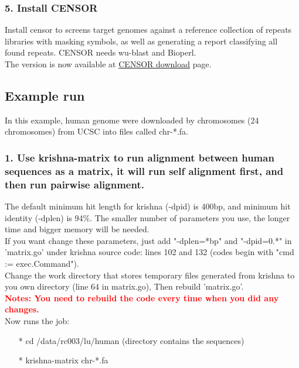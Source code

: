 \documentclass[12pt]{report}
\begin{document}
\subsubsection{5. Install CENSOR}
Install censor to screens target genomes against a reference collection of repeats libraries with masking symbols, as well as generating a report classifying all found repeats. CENSOR needs wu-blast and Bioperl.\\

The version is now available at \href{http://www.girinst.org/downloads/software/censor/} {\color{blue}CENSOR download} page.

\subsection*{Example run}
In this example, human genome were downloaded by chromosomes (24 chromosomes) from UCSC into files called chr-*.fa.\\

\subsubsection{1. Use krishna-matrix to run alignment between human sequences as a matrix, it will run self alignment first, and then run pairwise alignment.}

The default minimum hit length for krishna (-dpid) is 400bp, and minimum hit identity (-dplen) is 94\%. The smaller number of parameters you use, the longer time and bigger memory will be needed. \\

If you want change these parameters, just add "-dplen=*bp" and "-dpid=0.*" in 'matrix.go' under krishna source code: lines 102 and 132 (codes begin with "cmd := exec.Command").\\

Change the work directory that stores temporary files generated from krishna to you own directory (line 64 in matrix.go), Then rebuild 'matrix.go'. \\

\textbf{\textcolor{red}{Notes: You need to rebuild the code every time when you did any changes. }} \\

Now runs the job:
\begin{enumerate}
	\item[*] cd /data/rc003/lu/human (directory contains the sequences)
	\item[*] krishna-matrix chr-*.fa
\end{enumerate}
\end{document}
